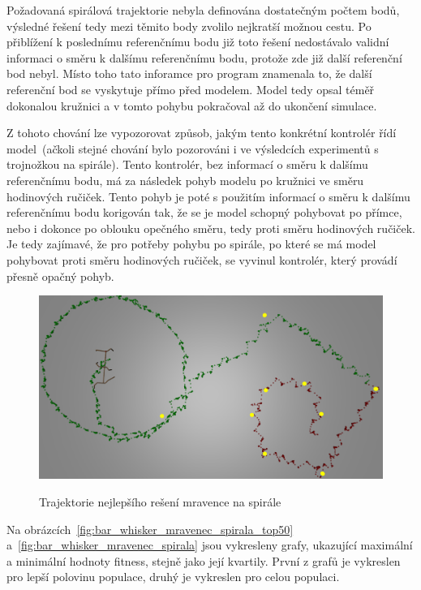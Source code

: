 Požadovaná spirálová trajektorie nebyla definována dostatečným počtem bodů, výsledné řešení tedy mezi těmito body zvolilo nejkratší možnou cestu.
Po přiblížení k poslednímu referenčnímu bodu již toto řešení nedostávalo validní informaci o směru k dalšímu referenčnímu bodu, protože zde již další referenční bod nebyl.
Místo toho tato inforamce pro program znamenala to, že další referenční bod se vyskytuje přímo před modelem.
Model tedy opsal téměř dokonalou kružnici a v tomto pohybu pokračoval až do ukončení simulace.

Z tohoto chování lze vypozorovat způsob, jakým tento konkrétní kontrolér řídí model~(ačkoli stejné chování bylo pozorováni i ve výsledcích experimentů s trojnožkou na spirále).
Tento kontrolér, bez informací o směru k dalšímu referenčnímu bodu, má za následek pohyb modelu po kružnici ve směru hodinových ručiček.
Tento pohyb je poté s použitím informací o směru k dalšímu referenčnímu bodu korigován tak, že se je model schopný pohybovat po přímce, nebo i dokonce po oblouku opečného směru, tedy proti směru hodinových ručiček.
Je tedy zajímavé, že pro potřeby pohybu po spirále, po které se má model pohybovat proti směru hodinových ručiček, se vyvinul kontrolér, který provádí přesně opačný pohyb.


\begin{figure}[h]
    \centering
    {\includegraphics[width=\linewidth]{obrazky/mravenec_spirala_zhora_nejlepsi_reseni_trajektorie.png}}
    \caption{
    Trajektorie nejlepšího rešení mravence na spirále
    }
    \label{fig:mravenec_spirala_zhora_nejlepsi_reseni_trajektorie}
\end{figure}

Na obrázcích~\ref{fig:bar_whisker_mravenec_spirala_top50} a~\ref{fig:bar_whisker_mravenec_spirala} jsou vykresleny grafy, ukazující maximální a minimální hodnoty fitness, stejně jako její kvartily.
První z grafů je vykreslen pro lepší polovinu populace, druhý je vykreslen pro celou populaci.

